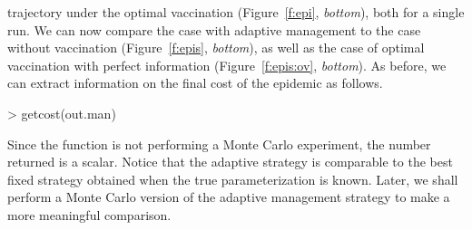 \documentclass[shortnames,nojss]{jss}
\begin{document}
trajectory under the optimal vaccination (Figure~\ref{f:epi}, {\em bottom}),
both for a single run. We can now compare the case with adaptive
management to the case without vaccination (Figure~\ref{f:epis},
{\em bottom}), as well as the case of optimal vaccination with perfect
information (Figure~\ref{f:epis:ov}, {\em bottom}).  As before, we can 
extract information on the final cost of the epidemic as follows.
\begin{Schunk}
\begin{Sinput}
> getcost(out.man)
\end{Sinput}
\end{Schunk}
Since the  function is not performing a Monte Carlo
experiment, the number returned is a scalar.  Notice that the adaptive
strategy is comparable to the best fixed strategy obtained when the
true parameterization is known.  Later, we shall perform a Monte Carlo
version of the adaptive management strategy to make a more meaningful
comparison.
\end{document}
